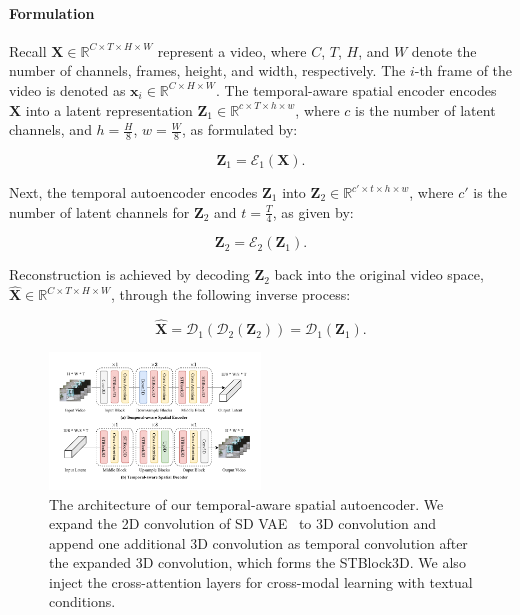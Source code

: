 \paragraph{Formulation}
Recall \( \mathbf{X} \in \mathbb{R}^{C \times T \times H \times W} \) represent a video, where \( C \), \( T \), \( H \), and \( W \) denote the number of channels, frames, height, and width, respectively. The \( i \)-th frame of the video is denoted as \( \mathbf{x}_i \in \mathbb{R}^{C \times H \times W} \). The temporal-aware spatial encoder encodes \( \mathbf{X} \) into a latent representation \( \mathbf{Z}_1 \in \mathbb{R}^{c \times T \times h \times w} \), where \( c \) is the number of latent channels, and \( h = \frac{H}{8} \), \( w = \frac{W}{8} \), as formulated by:

\begin{equation}
    \mathbf{Z}_1 = \mathcal{E}_1(\mathbf{X}).
\end{equation}

Next, the temporal autoencoder encodes \( \mathbf{Z}_1 \) into \( \mathbf{Z}_2 \in \mathbb{R}^{c' \times t \times h \times w} \), where \( c' \) is the number of latent channels for \( \mathbf{Z}_2 \) and \( t = \frac{T}{4} \), as given by:

\begin{equation}
    \mathbf{Z}_2 = \mathcal{E}_2(\mathbf{Z}_1).
\end{equation}

Reconstruction is achieved by decoding \( \mathbf{Z}_2 \) back into the original video space, \( \hat{\mathbf{X}} \in \mathbb{R}^{C \times T \times H \times W} \), through the following inverse process:

\begin{equation}
    \hat{\mathbf{X}} = \mathcal{D}_1(\mathcal{D}_2(\mathbf{Z}_2)) = \mathcal{D}_1(\mathbf{Z}_1).
\end{equation}


\begin{figure}[t]
\centering
\includegraphics[width=0.5\textwidth]{images/2+1D.pdf}
\caption{The architecture of our temporal-aware spatial autoencoder. We expand the 2D convolution of SD VAE~\cite{rombach2022high} to 3D convolution and append one additional 3D convolution as temporal convolution after the expanded 3D convolution, which forms the STBlock3D. We also inject the cross-attention layers for cross-modal learning with textual conditions. }
\label{fig:2+1D}
\vspace{-3mm}
\end{figure}


